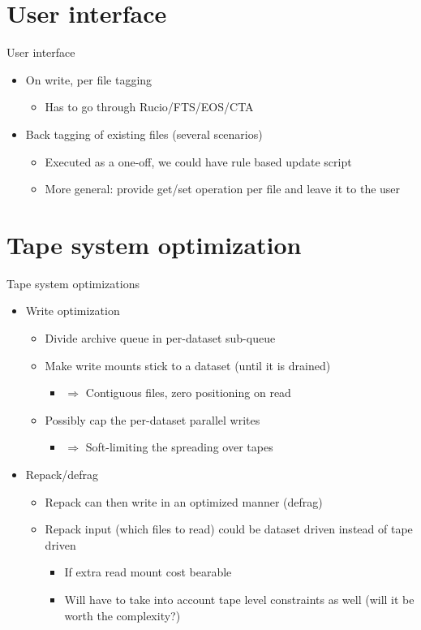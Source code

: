 \documentclass[aspectratio=149]{beamer}
\begin{document}
\section{User interface}
\begin{frame}{User interface}
\begin{itemize}
  \item On write, per file tagging
  \begin{itemize}
    \item Has to go through Rucio/FTS/EOS/CTA
  \end{itemize}
  \item Back tagging of existing files (several scenarios)
  \begin{itemize}
    \item Executed as a one-off, we could have rule based update script
    \item More general: provide get/set operation per file and leave it to the user
  \end{itemize}
\end{itemize}
\end{frame}

\section{Tape system optimization}
\begin{frame}{Tape system optimizations}
\begin{itemize}
  \item Write optimization
  \begin{itemize}
    \item Divide archive queue in per-dataset sub-queue
    \item Make write mounts stick to a dataset (until it is drained)
    \begin{itemize}
      \item $\Rightarrow$ Contiguous files, zero positioning on read
    \end{itemize}
    \item Possibly cap the per-dataset parallel writes
    \begin{itemize}
      \item $\Rightarrow$ Soft-limiting the spreading over tapes
    \end{itemize}
  \end{itemize}
  \item Repack/defrag
  \begin{itemize}
    \item Repack can then write in an optimized manner (defrag)
    \item Repack input (which files to read) could be dataset driven instead of tape driven
    \begin{itemize}
      \item If extra read mount cost bearable
      \item Will have to take into account tape level constraints as well (will it be worth the complexity?)
    \end{itemize}
  \end{itemize}
\end{itemize}
\end{frame}
\end{document}

